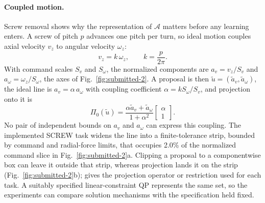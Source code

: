 \documentclass[12pt]{article}
\begin{document}
\paragraph{Coupled motion.} Screw removal shows why the representation of
$\mathcal A$ matters before any learning enters. A screw of pitch $p$ advances
one pitch per turn, so ideal motion couples axial velocity $v_z$ to angular
velocity $\omega_z$:
\begin{equation}
v_z=k\,\omega_z,\qquad k=\frac{p}{2\pi}.
\label{eq:pitch}
\end{equation}
With command scales $S_v$ and $S_\omega$, the normalized components are
$a_v=v_z/S_v$ and $a_\omega=\omega_z/S_\omega$, the axes of
Fig.~\ref{fig:submitted-2}. A proposal is then $\tilde u=(\tilde a_v,\tilde
a_\omega)$, the ideal line is $a_v=\alpha\,a_\omega$ with coupling coefficient
$\alpha=kS_\omega/S_v$, and projection onto it is
\begin{equation}
\Pi_0(\tilde u)=
\frac{\alpha\tilde a_v+\tilde a_\omega}{1+\alpha^2}
\begin{bmatrix}\alpha\\1\end{bmatrix}.
\label{eq:helix}
\end{equation}
No pair of independent bounds on $a_v$ and $a_\omega$ can express this
coupling. The implemented SCREW task widens the line into a finite-tolerance
strip, bounded by command and radial-force limits, that occupies 2.0\% of the
normalized command slice in Fig.~\ref{fig:submitted-2}a. Clipping a proposal
to a componentwise box can leave it outside that strip, whereas projection
lands it on the strip (Fig.~\ref{fig:submitted-2}b);  gives the
projection operator or restriction used for each task. A suitably specified linear-constraint QP represents the same set, so the
experiments can compare solution mechanisms with the specification held
fixed.
\end{document}
